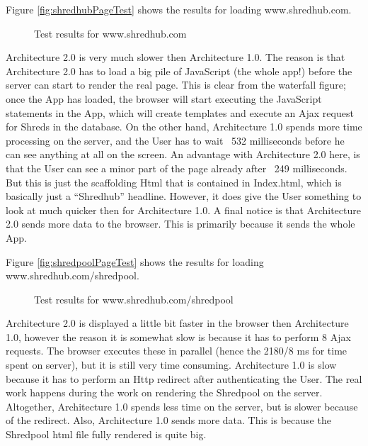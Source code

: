 Figure \vref{fig:shredhubPageTest} shows the results for loading www.shredhub.com.
\begin{figure}
\begin{center}
\end{center}
\caption{Test results for www.shredhub.com}
\label{fig:shredhubPageTest}
\end{figure}
Architecture 2.0 is very much slower then Architecture 1.0. The reason is that Architecture 2.0 has to load a big pile of JavaScript (the whole app!) before the server can start to render the real page. This is clear from the waterfall figure; once the App has loaded, the browser will start executing the JavaScript statements in the App, which will create templates and execute an Ajax request for Shreds in the database. On the other hand, Architecture 1.0 spends more time processing on the server, and the User has to wait ~532 milliseconds before he can see anything at all on the screen. An advantage with Architecture 2.0 here, is that the User can see a minor part of the page already after ~249 milliseconds. But this is just the scaffolding Html that is contained in Index.html, which is basically just a ``Shredhub'' headline. However, it does give the User something to look at much quicker then for Architecture 1.0. A final notice is that Architecture 2.0 sends more data to the browser. This is primarily because it sends the whole App.

Figure \vref{fig:shredpoolPageTest} shows the results for loading 
www.shredhub.com/shredpool.
\begin{figure}
\begin{center}
\end{center}
\caption{Test results for www.shredhub.com/shredpool}\label{fig:shredpoolPageTest}
\end{figure}
Architecture 2.0 is displayed a little bit faster in the browser then Architecture 1.0, however the reason it is somewhat slow is because it has to perform 8 Ajax requests. The browser executes these in parallel (hence the 2180/8 ms for time spent on server), but it is still very time consuming. Architecture 1.0 is slow because it has to perform an Http redirect after authenticating the User. The real work happens during the work on rendering the Shredpool on the server. Altogether, Architecture 1.0 spends less time on the server, but is slower because of the redirect. Also, Architecture 1.0 sends more data. This is because the Shredpool html file fully rendered is quite big.


